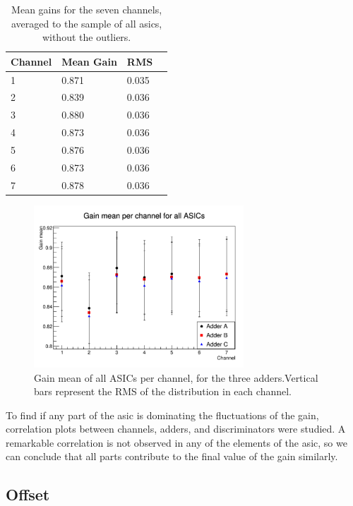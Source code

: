 \documentclass[main.tex]{subfiles}
\begin{document}
\begin{table}
  \centering
  \begin{tabular}{|l|l|l|l|}
    \hline
    Channel & Mean Gain & RMS \\
    \hline
    1 & 0.871 & 0.035 \\
    2 & 0.839 & 0.036 \\
    3 & 0.880 & 0.036 \\
    4 & 0.873 & 0.036 \\
    5 & 0.876 & 0.036 \\
    6 & 0.873 & 0.036 \\
    7 & 0.878 & 0.036 \\
    \hline
  \end{tabular}
  \caption{\label{tab:gainch} Mean gains for the seven channels, averaged to the sample of all asics, without the outliers.}
\end{table}

\begin{figure}[h]
  \centering
  \includegraphics[width=0.7\textwidth]{./Pictures/gainschannel.pdf}
  \caption{Gain mean of all ASICs per channel, for  the three adders.Vertical bars represent the RMS of the distribution in each channel.}\label{fig:gainch}
\end{figure}

To find if any part of the \gls{asic} is dominating the fluctuations of the gain, correlation plots between channels, adders, and discriminators were studied. A remarkable correlation is not observed in any of the elements of the \gls{asic}, so we can conclude that all parts contribute to the final value of the gain similarly.

\subsection{Offset}
\end{document}
